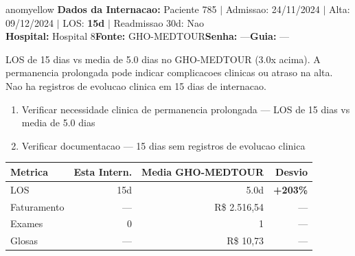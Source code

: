 \documentclass[a4paper,10pt]{article}
\begin{document}
\begin{anomalycard}[Internacao 747 | GHO-MEDTOUR | MODERADO (z=2.16)]{anomyellow}
\textbf{Dados da Internacao:} Paciente 785 $\mid$ Admissao: 24/11/2024 $\mid$ Alta: 09/12/2024 $\mid$ LOS: \textbf{15d} $\mid$ Readmissao 30d: Nao\\
\textbf{Hospital:} Hospital 8\quad\textbf{Fonte:} GHO-MEDTOUR\quad\textbf{Senha:} ---\quad\textbf{Guia:} ---\\
\vspace{2pt}\begin{tcolorbox}[colback=severityred!20,colframe=anomyellow,title={\textbf{Interpretacao de Negocio}},fonttitle=\bfseries\small,left=4pt,right=4pt,top=3pt,bottom=3pt]
{\small LOS de 15 dias vs media de 5.0 dias no GHO-MEDTOUR (3.0x acima). A permanencia prolongada pode indicar complicacoes clinicas ou atraso na alta. Nao ha registros de evolucao clinica em 15 dias de internacao.}
\end{tcolorbox}
\begin{tcolorbox}[colback=severityyellow!30,colframe=anomorange,title={\textbf{Recomendacoes Especificas}},fonttitle=\bfseries\small,left=4pt,right=4pt,top=3pt,bottom=3pt]
\begin{enumerate}[nosep,leftmargin=16pt]
\item {\small Verificar necessidade clinica de permanencia prolongada --- LOS de 15 dias vs media de 5.0 dias}
\item {\small Verificar documentacao --- 15 dias sem registros de evolucao clinica}
\end{enumerate}
\end{tcolorbox}
\begin{center}\begin{tabular}{l r r r}\toprule\textbf{Metrica} & \textbf{Esta Intern.} & \textbf{Media GHO-MEDTOUR} & \textbf{Desvio} \\\midrule
LOS & 15d & 5.0d & \textcolor{anomred}{\textbf{+203\%}} \\
Faturamento & --- & R\$ 2.516,54 & --- \\
Exames & 0 & 1 & --- \\
Glosas & --- & R\$ 10,73 & --- \\
\bottomrule\end{tabular}\end{center}


\end{anomalycard}
\end{document}
